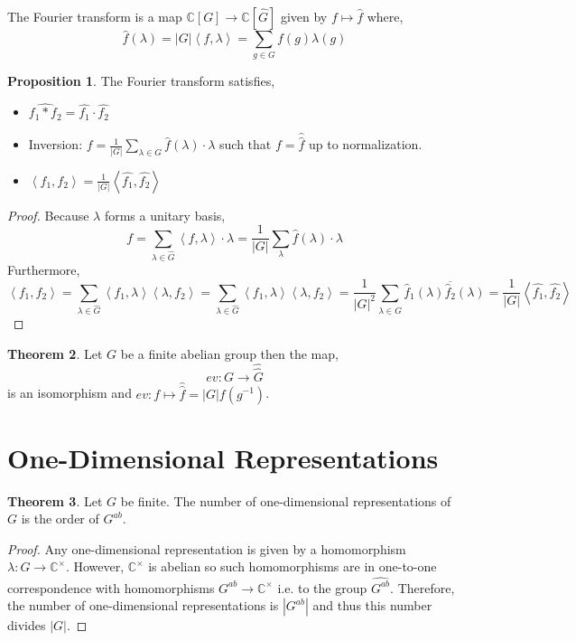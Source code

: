 \documentclass[12pt]{extarticle}
\newcommand{\C}{\mathbb{C}}
\newcommand{\inner}[2]{\left<#1, #2 \right>}
\theoremstyle{definition}
\newtheorem{theorem}{Theorem}[section]
\newtheorem{proposition}[theorem]{Proposition}
\newenvironment{definition}[1][Definition:]{\begin{trivlist}
\item[\hskip \labelsep {\bfseries #1}]}{\end{trivlist}}
\begin{document}
\begin{definition}
The Fourier transform is a map $\C[G] \to \C[\hat{G}]$ given by $f \mapsto \hat{f}$ where,
\[ \hat{f}(\lambda) = |G| \inner{f}{\lambda} = \sum_{g \in G} f(g) \lambda(g) \] 
\end{definition}

\begin{proposition}
The Fourier transform satisfies,
\begin{itemize}
\item $\widehat{f_1 * f_2} = \hat{f_1} \cdot \hat{f_2}$

\item Inversion: $f = \frac{1}{|G|} \sum\limits_{\lambda \in G} \hat{f}(\lambda) \cdot \lambda$ such that $f = \hat{\hat{f}}$ up to normalization.

\item $\left< f_1, f_2 \right> = \frac{1}{|G|} \left< \hat{f_1}, \hat{f_2} \right> $
\end{itemize}
\end{proposition}

\begin{proof}
Because $\lambda$ forms a unitary basis,
\[ f  = \sum_{\lambda \in \hat{G}} \inner{f}{\lambda} \cdot \lambda  = \frac{1}{|G|} \sum_{\lambda} \hat{f}(\lambda) \cdot \lambda \]
Furthermore,
\[ \inner{f_1}{f_2} = \sum_{\lambda \in \hat{G}} \inner{f_1}{\lambda} \inner{\lambda}{f_2} = \sum_{\lambda \in \hat{G}} \inner{f_1}{\lambda} \inner{\lambda}{f_2} = \frac{1}{|G|^2} \sum_{\lambda \in \hat{G}} \hat{f}_1(\lambda) \overline{\hat{f}_2}(\lambda) = \frac{1}{|G|} \inner{\hat{f_1}}{\hat{f_2}} \] 
\end{proof}

\begin{theorem}
Let $G$ be a finite abelian group then the map,
\[ ev : G \to \hat{\hat{G}} \]
is an isomorphism and $ev : f \mapsto \hat{\hat{f}} = |G| f(g^{-1})$.  
\end{theorem}

\section{One-Dimensional Representations}

\begin{theorem}
Let $G$ be finite. The number of one-dimensional representations of $G$ is the order of $G^{ab}$. 
\end{theorem}

\begin{proof}
Any one-dimensional representation is given by a homomorphism $\lambda : G \to \C^\times$. However, $\C^\times$ is abelian so such homomorphisms are in one-to-one correspondence with homomorphisms $G^{ab} \to \C^\times$ i.e. to the group $\widehat{G^{ab}}$. Therefore, the number of one-dimensional representations is $|G^{ab}|$ and thus this number divides $|G|$.  
\end{proof}
\end{document}
